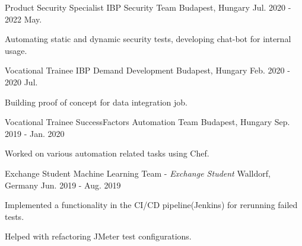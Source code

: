 \begin{cventries}

  \cventry
    {Product Security Specialist} %
    {IBP Security Team} %
    {Budapest, Hungary} %
    {Jul. 2020 - 2022 May.} %
    {
      \begin{cvitems} %
        \item {Automating static and dynamic security tests, developing chat-bot for internal usage.}
      \end{cvitems}
    }

  \cventry
    {Vocational Trainee} %
    {IBP Demand Development} %
    {Budapest, Hungary} %
    {Feb. 2020 - 2020 Jul.} %
    {
      \begin{cvitems} %
        \item {Building proof of concept for data integration job.}
      \end{cvitems}
    }

  \cventry
    {Vocational Trainee} %
    {SuccessFactors Automation Team} %
    {Budapest, Hungary} %
    {Sep. 2019 - Jan. 2020} %
    {
      \begin{cvitems} %
        \item {Worked on various automation related tasks using Chef.}
      \end{cvitems}
    }

  \cventry
    {Exchange Student} %
    {Machine Learning Team - \textit{Exchange Student}} %
    {Walldorf, Germany} %
    {Jun. 2019 - Aug. 2019} %
    {
      \begin{cvitems} %
        \item {Implemented a functionality in the CI/CD pipeline(Jenkins) for rerunning failed tests.}
        \item {Helped with refactoring JMeter test configurations.}
      \end{cvitems}
    }


\end{cventries}
